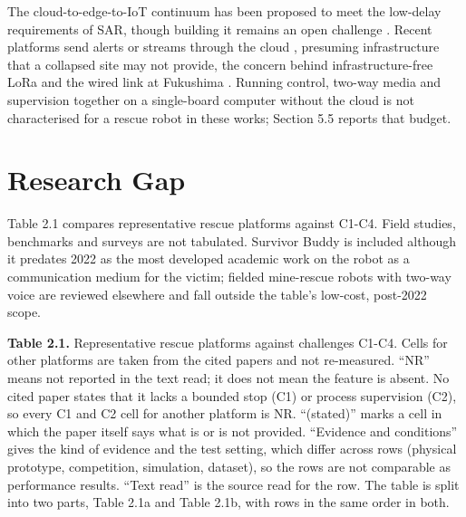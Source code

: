 The cloud-to-edge-to-IoT continuum has been proposed to meet the low-delay requirements of SAR, though building it remains an open challenge \cite{militano2023}. Recent platforms send alerts or streams through the cloud \cite{raghavan2026,cafolla2026}, presuming infrastructure that a collapsed site may not provide, the concern behind infrastructure-free LoRa \cite{manuel2022} and the wired link at Fukushima \cite{nagatani2013}. Running control, two-way media and supervision together on a single-board computer without the cloud is not characterised for a rescue robot in these works; Section 5.5 reports that budget.

\section{Research Gap}

Table 2.1 compares representative rescue platforms against C1-C4. Field studies, benchmarks and surveys \cite{murphy2004,casper2003,nagatani2013,kruijff2016,daun2023,jacoff2012,chung2023,liu2013,murphy2004hri,queralta2020,delmerico2019} are not tabulated. Survivor Buddy is included although it predates 2022 as the most developed academic work on the robot as a communication medium for the victim; fielded mine-rescue robots with two-way voice are reviewed elsewhere \cite{bakzadeh2026} and fall outside the table's low-cost, post-2022 scope.

\textbf{Table 2.1.} Representative rescue platforms against challenges C1-C4. Cells for other platforms are taken from the cited papers and not re-measured. ``NR'' means not reported in the text read; it does not mean the feature is absent. No cited paper states that it lacks a bounded stop (C1) or process supervision (C2), so every C1 and C2 cell for another platform is NR. ``(stated)'' marks a cell in which the paper itself says what is or is not provided. ``Evidence and conditions'' gives the kind of evidence and the test setting, which differ across rows (physical prototype, competition, simulation, dataset), so the rows are not comparable as performance results. ``Text read'' is the source read for the row. The table is split into two parts, Table 2.1a and Table 2.1b, with rows in the same order in both.

